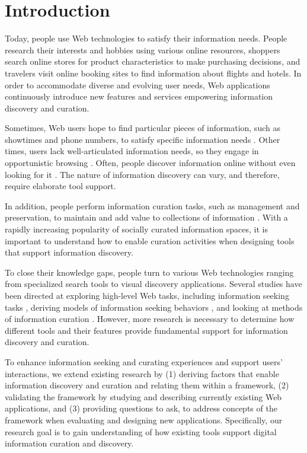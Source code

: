 \documentclass{casconpaper}
\begin{document}
{\section{Introduction}
Today, people use Web technologies to satisfy their information needs. People research their interests and hobbies using various online resources, shoppers search online stores for product characteristics to make purchasing decisions, and travelers visit online booking sites to find information about flights and hotels. In order to accommodate diverse and evolving user needs, Web applications continuously introduce new features and services empowering information discovery and curation. 

Sometimes, Web users hope to find particular pieces of information, such as showtimes and phone numbers, to satisfy specific information needs \cite{proper}. Other times, users lack well-articulated information needs, so they engage in opportunistic browsing \cite{lindley}. Often, people discover information online without even looking for it \cite{bates1986}. The nature of information discovery can vary, and therefore, require elaborate tool support.  

In addition, people perform information curation tasks, such as management and preservation, to maintain and add value to collections of information \cite{beagrie}. With a rapidly increasing popularity of socially curated information spaces, it is important to understand how to enable curation activities when designing tools that support information discovery.

To close their knowledge gaps, people turn to various Web technologies ranging from specialized search tools to visual discovery applications. Several studies have been directed at exploring high-level Web tasks, including information seeking tasks \cite{kellar2006, kellar2007, morrison, sellen}, deriving models of information seeking behaviors \cite{choo, ellis1989, ellis1993, ellis1997, bates1986, bates2002}, and looking at methods of information curation \cite{beagrie, wittaker}. However, more research is necessary to determine how different tools and their features provide fundamental support for information discovery and curation.

To enhance information seeking and curating experiences and support users' interactions, we extend existing research by (1) deriving factors that enable information discovery and curation and relating them within a framework, (2) validating the framework by studying and describing currently existing Web applications, and (3) providing questions to ask, to address concepts of the framework when evaluating and designing new applications. Specifically, our research goal is to gain understanding of how existing tools support digital information curation and discovery. 

}
\end{document}
